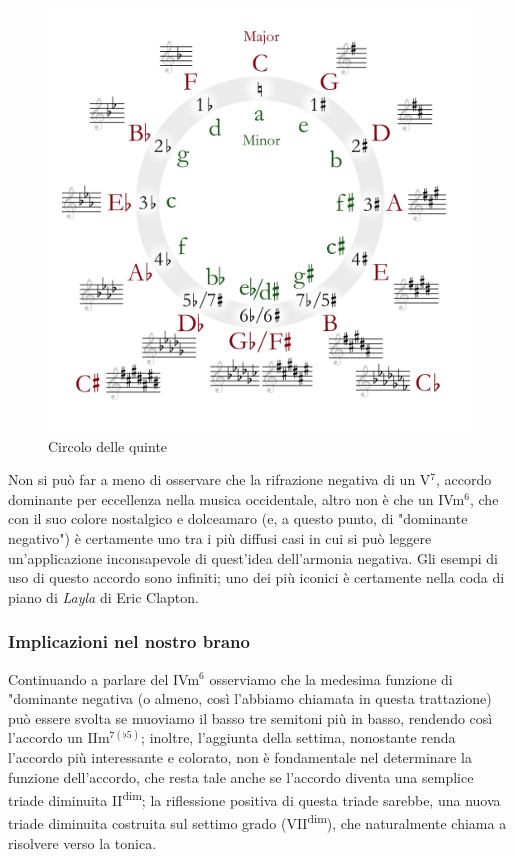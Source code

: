 \documentclass[12pt]{article}
\begin{document}
\begin{figure}
 \includegraphics[width=\linewidth]{aa/circle}
 \caption{Circolo delle quinte}
 \label{fig:circle}
 \centering
\end{figure}


Non si può far a meno di osservare che la rifrazione negativa di un V\(^{7}\), accordo dominante per eccellenza nella musica occidentale, altro non è che un IVm\(^{6}\), che con il suo colore nostalgico e dolceamaro (e, a questo punto, di "dominante negativo") è certamente uno tra i più diffusi casi in cui si può leggere un'applicazione inconsapevole di quest'idea dell'armonia negativa. Gli esempi di uso di questo accordo sono infiniti; uno dei più iconici è certamente nella coda di piano di \emph{Layla} di Eric Clapton.

\subsubsection{Implicazioni nel nostro brano}
Continuando a parlare del IVm\(^{6}\) osserviamo che la medesima funzione di "dominante negativa (o almeno, così l'abbiamo chiamata in questa trattazione) può essere svolta se muoviamo il basso tre semitoni più in basso, rendendo così l'accordo un IIm\(^{7(\flat5)}\); inoltre, l'aggiunta della settima, nonostante renda l'accordo più interessante e colorato, non è fondamentale nel determinare la funzione dell'accordo, che resta tale anche se l'accordo diventa una semplice triade diminuita II\textsuperscript{dim}; la riflessione positiva di questa triade sarebbe, una nuova triade diminuita costruita sul settimo grado (VII\textsuperscript{dim}), che naturalmente chiama a risolvere verso la tonica.
\end{document}
